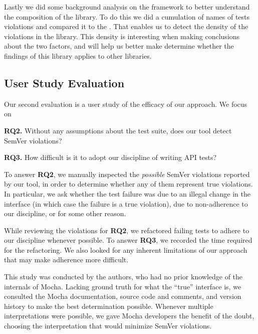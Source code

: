 Lastly we did some background analysis on the framework to better
understand the composition of the library. To do this we did a
cumulation of names of tests violations and compared it to the
.  That enables us to detect the
density of the violations in the library. This density is interesting
when making conclusions about the two factors, and will help us better
make determine whether the findings of this library applies to other 
libraries.

\subsection{User Study Evaluation}
Our second evaluation is a user study of the efficacy of our
approach. We focus on 

{\bf RQ2.} Without any assumptions about the test suite, does our tool
detect SemVer violations?

{\bf RQ3.} How difficult is it to adopt our discipline of writing API
tests?

To answer {\bf RQ2}, we manually inspected the {\em possible\/} SemVer
violations reported by our tool, in order to determine whether any of
them represent true violations. In particular, we ask whether the test
failure was due to an illegal change in the interface (in which case
the failure is a true violation), due to non-adherence to our
discipline, or for some other reason.

While reviewing the violations for {\bf RQ2}, we refactored failing
tests to adhere to our discipline whenever possible. To answer {\bf
  RQ3}, we recorded the time required for the refactoring. We also
looked for any inherent limitations of our approach that may make
adherence more difficult.

This study was conducted by the authors, who had no prior knowledge of
the internals of Mocha. Lacking ground truth for what the ``true''
interface is, we consulted the Mocha documentation, source code and
comments, and version history to make the best determination
possible. Whenever multiple interpretations were possible, we gave
Mocha developers the benefit of the doubt, choosing the interpretation
that would minimize SemVer violations.

